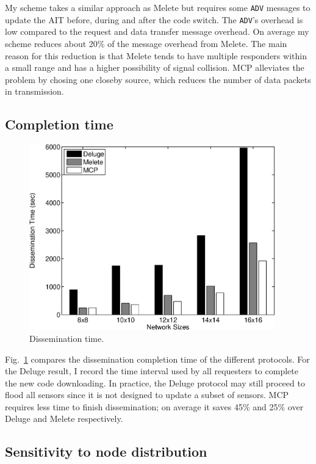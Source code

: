 My scheme takes a similar approach as Melete but requires some {\tt ADV} messages to update the AIT before, during and 
after the code switch. The {\tt ADV}'s overhead is low compared to the request and data transfer message overhead. On 
average my scheme reduces about 20\% of the message overhead from Melete. The main reason for this reduction is that 
Melete tends to have multiple responders within a small range and has a higher possibility of signal collision. MCP 
alleviates the problem by chosing one closeby source, which reduces the number of data packets in transmission.

\subsection{Completion time}

\begin{figure}[htbp]
\centering
\includegraphics[width=4.2in]{figures/ftime.eps}
\caption{Dissemination time.}
\label{ftime}
\end{figure}

Fig.~\ref{ftime} compares the dissemination completion time of the different protocols. For the Deluge result, I record 
the time interval used by all requesters to complete the new code downloading. In practice, the Deluge protocol may 
still proceed to flood all sensors since it is not designed to update a subset of sensors. MCP requires less time to 
finish dissemination; on average it saves 45\% and 25\% over Deluge and Melete respectively.

\subsection{Sensitivity to node distribution}

